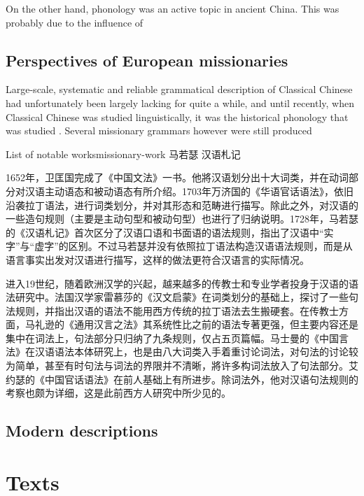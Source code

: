 \documentclass[UTF8, a4paper, oneside, scheme=plain, 12pt]{ctexrep}
\newcommand*{\citepage}[1]{p.~{#1}}
\begin{document}
On the other hand, phonology was an active topic in ancient China.
This was probably due to the influence of 

\subsection{Perspectives of European missionaries}

Large-scale, systematic and reliable grammatical description of Classical Chinese had unfortunately been largely lacking for quite a while, and until recently, when Classical Chinese was studied linguistically, it was the historical phonology that was studied \citep[\citepage{xiii}]{pulleyblank1995outline}.
Several missionary grammars however were still produced 

\begin{todobox}{List of notable works}{missionary-work}
    马若瑟 汉语札记

    1652年，卫匡国完成了《中国文法》一书。他將汉语划分出十大词类，并在动词部分对汉语主动语态和被动语态有所介绍。1703年万济国的《华语官话语法》，依旧沿袭拉丁语法，进行词类划分，并对其形态和范畴进行描写。除此之外，对汉语的一些造句规则（主要是主动句型和被动句型）也进行了归纳说明。1728年，马若瑟的《汉语札记》首次区分了汉语口语和书面语的语法规则，指出了汉语中“实字”与“虚字”的区别。不过马若瑟并没有依照拉丁语法构造汉语语法规则，而是从语言事实出发对汉语进行描写，这样的做法更符合汉语言的实际情况。

    进入19世纪，随着欧洲汉学的兴起，越来越多的传教士和专业学者投身于汉语的语法研究中。法国汉学家雷慕莎的《汉文启蒙》在词类划分的基础上，探讨了一些句法规则，并指出汉语的语法不能用西方传统的拉丁语法去生搬硬套。在传教士方面，马礼逊的《通用汉言之法》其系统性比之前的语法专著更强，但主要内容还是集中在词法上，句法部分只归纳了九条规则，仅占五页篇幅。马士曼的《中国言法》在汉语语法本体研究上，也是由八大词类入手着重讨论词法，对句法的讨论较为简单，甚至有时句法与词法的界限并不清晰，將许多构词法放入了句法部分。艾约瑟的《中国官话语法》在前人基础上有所进步。除词法外，他对汉语句法规则的考察也颇为详细，这是此前西方人研究中所少见的。
\end{todobox}

\subsection{Modern descriptions}\label{sec:introduction.previous.modern}

\section{Texts}\label{sec:introduction.text}
\end{document}
